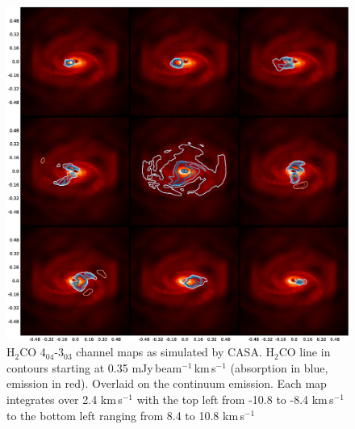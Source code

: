 \documentclass[useAMS,usenatbib]{mn2e}
\begin{document}


%
%
%
%
%

\begin{figure}
 \includegraphics[width=168mm]{Figures/sim/channel_map-1.eps} 
 \caption{H$_2$CO 4$_{04}$-3$_{03}$ channel maps as simulated by CASA. H$_2$CO line in contours starting at 0.35 mJy$\,$beam$^{-1}\,$km$\,$s$^{-1}$ (absorption in blue, emission in red). Overlaid on the continuum emission. Each map integrates over 2.4 km$\,$s$^{-1}$ with the top left from -10.8 to -8.4 km$\,$s$^{-1}$ to the bottom left ranging from 8.4 to 10.8 km$\,$s$^{-1}$}
 \label{h2co_chanmap}
\end{figure}
\end{document}
